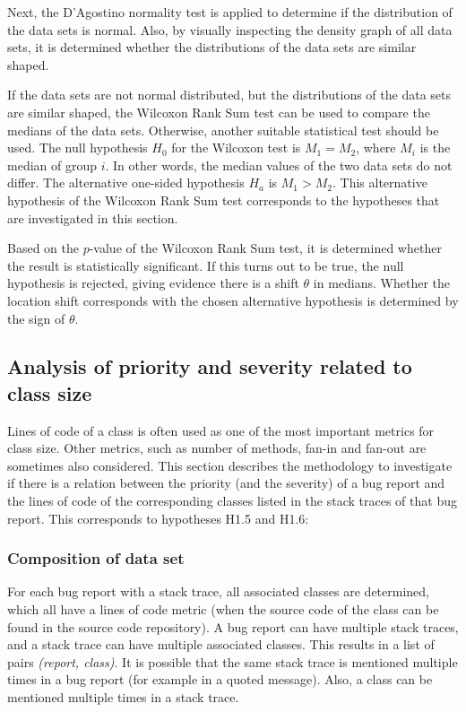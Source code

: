 Next, the D'Agostino normality test is applied to determine if the distribution of the data sets is normal. Also, by visually inspecting the density graph of all data sets, it is determined whether the distributions of the data sets are similar shaped.

If the data sets are not normal distributed, but the distributions of the data sets are similar shaped, the Wilcoxon Rank Sum test can be used to compare the medians of the data sets. Otherwise, another suitable statistical test should be used. The null hypothesis $H_0$ for the Wilcoxon test is $M_1 = M_2$, where $M_i$ is the median of group $i$. In other words, the median values of the two data sets do not differ. The alternative one-sided hypothesis $H_a$ is $M_1 > M_2$. This alternative hypothesis of the Wilcoxon Rank Sum test corresponds to the hypotheses that are investigated in this section.

Based on the $p$-value of the Wilcoxon Rank Sum test, it is determined whether the result is statistically significant. If this turns out to be true, the null hypothesis is rejected, giving evidence there is a shift $\theta$ in medians. Whether the location shift corresponds with the chosen alternative hypothesis is determined by the sign of $\theta$.


\subsection{Analysis of priority and severity related to class size} %
\label{sub:analysis_of_priority_and_severity_related_to_class_size}
Lines of code of a class is often used as one of the most important metrics for class size. Other metrics, such as number of methods, fan-in and fan-out are sometimes also considered. This section describes the methodology to investigate if there is a relation between the priority (and the severity) of a bug report and the lines of code of the corresponding classes listed in the stack traces of that bug report. This corresponds to hypotheses H1.5 and H1.6:

\vspace{\baselineskip}
\hypae{}

\vspace{\baselineskip}
\hypaf{}

\vspace{\baselineskip}

\subsubsection{Composition of data set}
For each bug report with a stack trace, all associated classes are determined, which all have a lines of code metric (when the source code of the class can be found in the source code repository). A bug report can have multiple stack traces, and a stack trace can have multiple associated classes. This results in a list of pairs \emph{(report, class)}. It is possible that the same stack trace is mentioned multiple times in a bug report (for example in a quoted message). Also, a class can be mentioned multiple times in a stack trace. 


